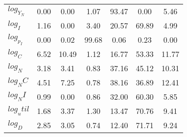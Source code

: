 \begin{center}
\begin{longtable}{lcccccc}
$log_Y_N   $	 & 	        0.00	 & 	        0.00	 & 	        1.07	 & 	       93.47	 & 	        0.00	 & 	        5.46 \\ 
$log_I     $	 & 	        1.16	 & 	        0.00	 & 	        3.40	 & 	       20.57	 & 	       69.89	 & 	        4.99 \\ 
$log_p_I   $	 & 	        0.00	 & 	        0.02	 & 	       99.68	 & 	        0.06	 & 	        0.23	 & 	        0.00 \\ 
$log_C     $	 & 	        6.52	 & 	       10.49	 & 	        1.12	 & 	       16.77	 & 	       53.33	 & 	       11.77 \\ 
$log_N     $	 & 	        3.18	 & 	        3.41	 & 	        0.83	 & 	       37.16	 & 	       45.12	 & 	       10.31 \\ 
$log_NC    $	 & 	        4.51	 & 	        7.25	 & 	        0.78	 & 	       38.16	 & 	       36.89	 & 	       12.41 \\ 
$log_NI    $	 & 	        0.99	 & 	        0.00	 & 	        0.86	 & 	       32.00	 & 	       60.30	 & 	        5.85 \\ 
$log_util  $	 & 	        1.68	 & 	        3.37	 & 	        1.30	 & 	       13.47	 & 	       70.76	 & 	        9.41 \\ 
$log_D     $	 & 	        2.85	 & 	        3.05	 & 	        0.74	 & 	       12.40	 & 	       71.71	 & 	        9.24 \\ 
\end{longtable}
 \end{center}
